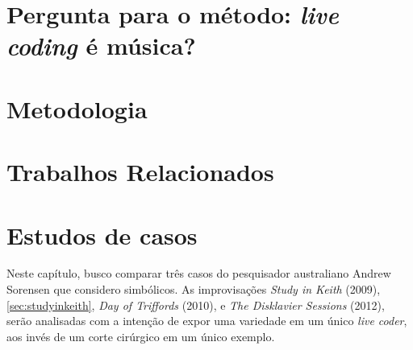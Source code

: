 \documentclass[
	12pt,				%
	openright,			%
	twoside,			%
	a4paper,			%
	english,			%
	french,				%
	spanish,			%
        italian,                        %
	brazil				%
	]{abntex2}
\begin{document}



\begingroup
\let\clearpage\relax
\chapter{Pergunta para o método: \emph{live coding} é música?}\label{cap:introducao}

\endgroup

\chapter{Metodologia}\label{cap:metodologia}


\chapter{Trabalhos Relacionados}\label{cap:trabalhos_relacionados}


\chapter{Estudos de casos}\label{cap:estudos_de_caso}

Neste capítulo, busco comparar três casos do pesquisador australiano Andrew Sorensen que considero simbólicos. As improvisações \emph{Study in Keith} (2009), \autoref{sec:studyinkeith}, \emph{Day of Triffords} (2010), e \emph{The Disklavier Sessions} (2012), serão analisadas com a intenção de expor uma variedade em um único \emph{live coder}, aos invés de um corte cirúrgico em um único exemplo.
\end{document}
